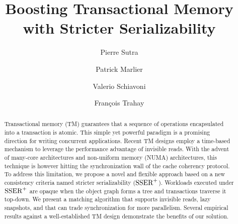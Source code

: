 \documentclass[runningheads]{llncs}
\begin{document}
{ \newcommand{\mynote}[3]{
   \fbox{\bfseries\sffamily\scriptsize#1}
   {\small$\blacktriangleright$\textsf{\emph{\color{#3}{#2}}}$\blacktriangleleft$}}}
{ \newcommand{\mynote}[3]{}}
\newcommand{\pf}[1]{\mynote{Pierre}{#1}{red}}
\newcommand{\hm}[1]{\mynote{Patrick}{#1}{pink}}
\newcommand{\vs}[1]{\mynote{Valerio}{#1}{blue}}
\newcommand{\ft}[1]{\mynote{Francois}{#1}{green}}


\title{Boosting Transactional Memory\\with Stricter Serializability}

\author{Pierre Sutra \and Patrick Marlier \and
 Valerio Schiavoni \and Fran\c{c}ois Trahay}

\maketitle

\begin{abstract}
  Transactional memory (TM) guarantees that a sequence of operations encapsulated into a transaction is atomic.
  This simple yet powerful paradigm is a promising direction for writing concurrent applications.
  Recent TM designs employ a time-based mechanism to leverage the performance advantage of invisible reads.
  With the advent of many-core architectures and non-uniform memory (NUMA) architectures, this technique is however hitting the synchronization wall of the cache coherency protocol.
  To address this limitation, we propose a novel and flexible approach based on a new consistency criteria named stricter serializability ($\SPSER$).
  Workloads executed under $\SPSER$ are opaque when the object graph forms a tree and transactions traverse it top-down.  
  We present a matching algorithm that supports invisible reads, lazy snapshots, and that can trade synchronization for more parallelism.
  Several empirical results against a well-established TM design demonstrate the benefits of our solution.
\end{abstract}




%




{
  
  
}  
\end{document}
